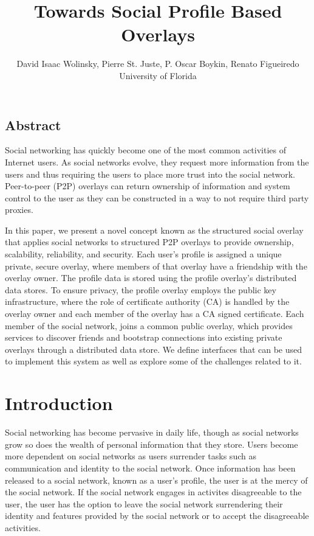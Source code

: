 \documentclass[letterpaper,twocolumn,10pt]{article}
\begin{document}
\title{\Large \bf Towards Social Profile Based Overlays}

\author{
David Isaac Wolinsky,
Pierre St. Juste,
P. Oscar Boykin,
Renato Figueiredo
\\
University of Florida
\\
}




\subsection*{Abstract}
Social networking has quickly become one of the most common activities of
Internet users. As social networks evolve, they request more information from
the users and thus requiring the users to place more trust into the social
network. Peer-to-peer (P2P) overlays can return ownership of information and
system control to the user as they can be constructed in a way to not require
third party proxies.

In this paper, we present a novel concept known as the structured social overlay
that applies social networks to structured P2P overlays to provide ownership,
scalability, reliability, and security. Each user's profile is assigned a
unique private, secure overlay, where members of that overlay have a friendship
with the overlay owner. The profile data is stored using the profile overlay's
distributed data stores. To ensure privacy, the profile overlay employs the
public key infrastructure, where the role of certificate authority (CA) is
handled by the overlay owner and each member of the overlay has a CA signed
certificate. Each member of the social network, joins a common public overlay,
which provides services to discover friends and bootstrap connections into
existing private overlays through a distributed data store. We define interfaces
that can be used to implement this system as well as explore some of the
challenges related to it.

\section{Introduction}
Social networking has become pervasive in daily life, though as social networks
grow so does the wealth of personal information that they store.  Users become
more dependent on social networks as users surrender tasks such as communication
and identity to the social network.  Once information has been released to a
social network, known as a user's profile, the user is at the mercy of the
social network.  If the social network engages in activites disagreeable to the
user, the user has the option to leave the social network surrendering their
identity and features provided by the social network or to accept the
disagreeable activities.
\end{document}
